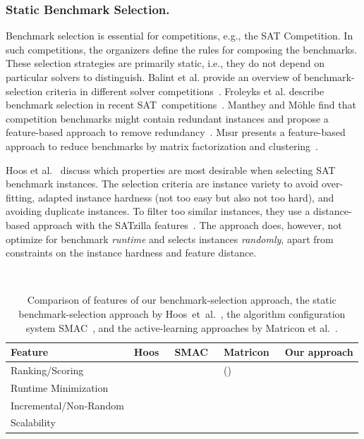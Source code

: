 \documentclass[runningheads]{llncs}
\newcommand{\cmark}{\ding{51}} %
\newcommand{\xmark}{\ding{55}}
\begin{document}
\subsubsection{Static Benchmark Selection.}

Benchmark selection is essential for competitions, e.g., the SAT Competition.
In such competitions, the organizers define the rules for composing the benchmarks.
These selection strategies are primarily static, i.e., they do not depend on particular solvers to distinguish.
Balint et al. provide an overview of benchmark-selection criteria in different solver competitions~\cite{balint2015overview}.
Froleyks et al. describe benchmark selection in recent SAT~competitions~\cite{FroleyksHIJS21}.
Manthey and Möhle find that competition benchmarks might contain redundant instances and propose a feature-based approach to remove redundancy~\cite{manthey2016better}.
M{\i}s{\i}r presents a feature-based approach to reduce benchmarks by matrix factorization and clustering~\cite{misir2021benchmark}.

Hoos et al.~\cite{HoosKSS13} discuss which properties are most desirable when selecting SAT benchmark instances.
The selection criteria are instance variety to avoid over-fitting, adapted instance hardness (not too easy but also not too hard), and avoiding duplicate instances.
To filter too similar instances, they use a distance-based approach with the SATzilla features~\cite{XuHHL08,features}.
The approach does, however, not optimize for benchmark \emph{runtime} and selects instances \emph{randomly}, apart from constraints on the instance hardness and feature distance.

\begin{table}[tbp]
  \centering
  \caption{Comparison of features of our benchmark-selection approach, the static benchmark-selection approach by Hoos~et~al.~\cite{HoosKSS13}, the algorithm configuration system SMAC~\cite{HutterHL11}, and the active-learning approaches by Matricon et al.~\cite{MatriconAFSH21}.
  }
  \label{tab:requirements}
  ~\\[1em]
  \begin{tabular}{
    m{}
    >{\centering\arraybackslash}m{}
    >{\centering\arraybackslash}m{}
    >{\centering\arraybackslash}m{}
    >{\centering\arraybackslash}m{}
  }
    \toprule
    Feature & Hoos~\cite{HoosKSS13} & SMAC~\cite{HutterHL11} & Matricon~\cite{MatriconAFSH21} & Our approach \\
    \midrule
    Ranking/Scoring & \cmark & \xmark & (\cmark) & \cmark \\
    Runtime Minimization & \xmark & \cmark & \cmark & \cmark \\
    Incremental/Non-Random & \xmark & \xmark & \cmark & \cmark \\
    Scalability & \cmark & \cmark & \xmark & \cmark \\
    \bottomrule
  \end{tabular}
\end{table}
\end{document}
